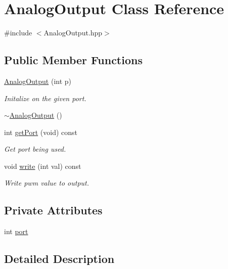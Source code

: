 \hypertarget{class_analog_output}{}\section{Analog\+Output Class Reference}
\label{class_analog_output}


{\ttfamily \#include $<$Analog\+Output.\+hpp$>$}

\subsection*{Public Member Functions}
\begin{DoxyCompactItemize}
\item 
\hyperlink{class_analog_output_ab92457661db417a929abe3ebff3e8e60}{Analog\+Output} (int p)
\begin{DoxyCompactList}\small\item\em Initalize on the given port. \end{DoxyCompactList}\item 
\hyperlink{class_analog_output_a7848a6b7b7c15bba5c75f0f82f3c1d53}{$\sim$\+Analog\+Output} ()
\item 
int \hyperlink{class_analog_output_abc1f7308376f4b0f0cb7bb34802ce9e3}{get\+Port} (void) const
\begin{DoxyCompactList}\small\item\em Get port being used. \end{DoxyCompactList}\item 
void \hyperlink{class_analog_output_a16fc372acf8e7d7525d119804b374406}{write} (int val) const
\begin{DoxyCompactList}\small\item\em Write pwm value to output. \end{DoxyCompactList}\end{DoxyCompactItemize}
\subsection*{Private Attributes}
\begin{DoxyCompactItemize}
\item 
int \hyperlink{class_analog_output_a52a084ec21b0e7f4cf9eb29af2fd103c}{port}
\end{DoxyCompactItemize}


\subsection{Detailed Description}


